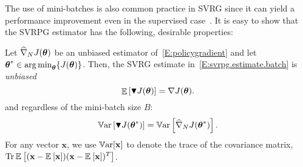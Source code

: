 The use of mini-batches is also common practice in \acs{SVRG} since it can yield a performance improvement even in the supervised case~\citep{harikandeh2015stopwasting,konevcny2016mini}. It is easy to show that the \acs{SVRPG} estimator has the following, desirable properties:
\begin{lemma}\label{L:svrpg.properties}
	Let $\wh{\nabla}_N J(\vtheta)$ be an unbiased estimator of~\eqref{E:policygradient}
	and let $\vtheta^* \in \argmin_{\vtheta} \{J(\vtheta)\}$. Then, the \acs{SVRG} estimate in~\eqref{E:svrpg.estimate.batch} is \emph{unbiased}
	\begin{equation}\label{eq:unbiased}
	\mathop{\mathbb{E}}
	\left[\blacktriangledown J(\vtheta)\right] = \gradJ{\vtheta}.
	\end{equation}
	and regardless of the mini-batch size $B$:
	\begin{equation}\label{eq:zerovar}
	\Var\left[\gradBlack{\vtheta^*}\right] = 
	\Var\left[\wh{\nabla}_N J(\vtheta^*)\right].
	\end{equation}
	For any vector $\mathbf{x}$, we use $\Var[\mathbf{x}]$ to denote the trace of the covariance matrix, \ie $\Tr\EVV[]{(\mathbf{x}-\EVV[]{\mathbf{x}})(\mathbf{x}-\EVV[]{\mathbf{x}})^T}$.
\end{lemma}
